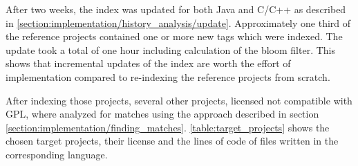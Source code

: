 After two weeks, the index was updated for both Java and C/C++ as described in \ref{section:implementation/history_analysis/update}.
Approximately one third of the reference projects contained one or more new tags which were indexed.
The update took a total of one hour including calculation of the bloom filter.
This shows that incremental updates of the index are worth the effort of implementation compared to re-indexing the reference projects from scratch.

After indexing those projects, several other projects, licensed not compatible with GPL, where analyzed for matches using the approach described in section \ref{section:implementation/finding_matches}.
\autoref{table:target_projects} shows the chosen target projects, their license and the lines of code of files written in the corresponding language.


